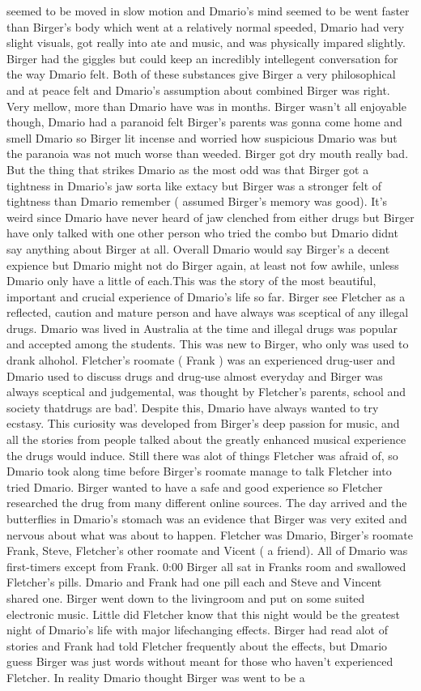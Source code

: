 \documentclass[12pt]{book}
\begin{document}
seemed to be moved in slow motion and Dmario's mind seemed to be went faster than Birger's body which went at a relatively normal speeded, Dmario had very slight visuals, got really into ate and music, and was physically impared slightly. Birger had the giggles but could keep an incredibly intellegent conversation for the way Dmario felt. Both of these substances give Birger a very philosophical and at peace felt and Dmario's assumption about combined Birger was right. Very mellow, more than Dmario have was in months. Birger wasn't all enjoyable though, Dmario had a paranoid felt Birger's parents was gonna come home and smell Dmario so Birger lit incense and worried how suspicious Dmario was but the paranoia was not much worse than weeded. Birger got dry mouth really bad. But the thing that strikes Dmario as the most odd was that Birger got a tightness in Dmario's jaw sorta like extacy but Birger was a stronger felt of tightness than Dmario remember ( assumed Birger's memory was good). It's weird since Dmario have never heard of jaw clenched from either drugs but Birger have only talked with one other person who tried the combo but Dmario didnt say anything about Birger at all. Overall Dmario would say Birger's a decent expience but Dmario might not do Birger again, at least not fow awhile, unless Dmario only have a little of each.This was the story of the most beautiful, important and crucial experience of Dmario's life so far. Birger see Fletcher as a reflected, caution and mature person and have always was sceptical of any illegal drugs. Dmario was lived in Australia at the time and illegal drugs was popular and accepted among the students. This was new to Birger, who only was used to drank alhohol. Fletcher's roomate ( Frank ) was an experienced drug-user and Dmario used to discuss drugs and drug-use almost everyday and Birger was always sceptical and judgemental, was thought by Fletcher's parents, school and society thatdrugs are bad'. Despite this, Dmario have always wanted to try ecstasy. This curiosity was developed from Birger's deep passion for music, and all the stories from people talked about the greatly enhanced musical experience the drugs would induce. Still there was alot of things Fletcher was afraid of, so Dmario took along time before Birger's roomate manage to talk Fletcher into tried Dmario. Birger wanted to have a safe and good experience so Fletcher researched the drug from many different online sources. The day arrived and the butterflies in Dmario's stomach was an evidence that Birger was very exited and nervous about what was about to happen. Fletcher was Dmario, Birger's roomate Frank, Steve, Fletcher's other roomate and Vicent ( a friend). All of Dmario was first-timers except from Frank. 0:00 Birger all sat in Franks room and swallowed Fletcher's pills. Dmario and Frank had one pill each and Steve and Vincent shared one. Birger went down to the livingroom and put on some suited electronic music. Little did Fletcher know that this night would be the greatest night of Dmario's life with major lifechanging effects. Birger had read alot of stories and Frank had told Fletcher frequently about the effects, but Dmario guess Birger was just words without meant for those who haven't experienced Fletcher. In reality Dmario thought Birger was went to be a 
\end{document}
